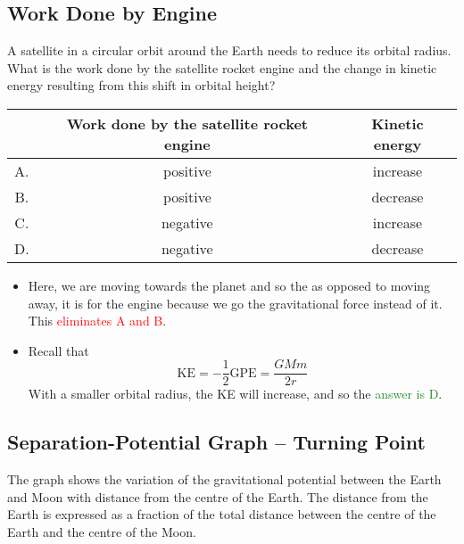 \documentclass[a4paper,12pt]{article}
\begin{document}
\pagebreak

\subsection{Work Done by Engine}

A satellite in a circular orbit around the Earth needs to reduce its orbital radius.
What is the work done by the satellite rocket engine and the change in kinetic energy resulting from this shift in orbital height?

\begin{table}[H]
  \centering\begin{tabular}{|c|c|c|}
    \hline    & Work done by the satellite rocket engine & Kinetic energy \\
    \hline A. & positive                                 & increase       \\
    \hline B. & positive                                 & decrease       \\
    \hline C. & negative                                 & increase       \\
    \hline D. & negative                                 & decrease       \\
    \hline
  \end{tabular}
\end{table}

\begin{itemize}
  \item Here, we are moving towards the planet and so the as opposed to moving away, it is  for the engine because we go  the gravitational force instead of  it. This \textcolor{red}{eliminates A and B}.
  \item Recall that $$\text{KE} = -\frac{1}{2}\text{GPE} = \frac{GMm}{2r}$$
        With a smaller orbital radius, the KE will increase, and so the \textcolor{ForestGreen}{answer is D}.


\end{itemize}

\pagebreak

\subsection{Separation-Potential Graph -- Turning Point}

The graph shows the variation of the gravitational potential between the Earth and Moon with distance from the centre of the Earth. The distance from the Earth is expressed as a fraction of the total distance between the centre of the Earth and the centre of the Moon.
\end{document}
